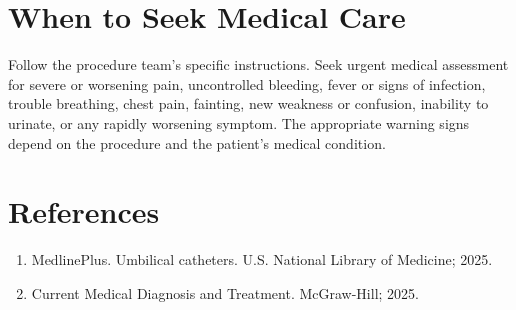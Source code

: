 \section*{When to Seek Medical Care}
Follow the procedure team's specific instructions. Seek urgent medical assessment for severe or worsening pain, uncontrolled bleeding, fever or signs of infection, trouble breathing, chest pain, fainting, new weakness or confusion, inability to urinate, or any rapidly worsening symptom. The appropriate warning signs depend on the procedure and the patient's medical condition.

\section*{References}
\begin{enumerate}
  \item MedlinePlus. Umbilical catheters. U.S. National Library of Medicine; 2025.
  \item Current Medical Diagnosis and Treatment. McGraw-Hill; 2025.
\end{enumerate}

\clearpage
